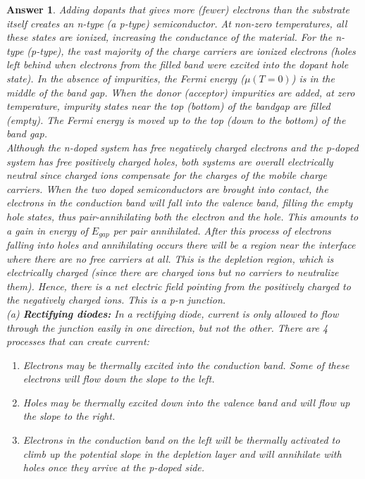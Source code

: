 \documentclass[a4paper]{article}
\newtheorem{ans}{Answer}[subsection]
\theoremstyle{new}
\begin{document}
\begin{ans}
Adding dopants that gives more (fewer) electrons than the substrate itself creates an n-type (a p-type) semiconductor. At non-zero temperatures, all these states are ionized, increasing the conductance of the material. For the n-type (p-type), the vast majority of the charge carriers are ionized electrons (holes left behind when electrons from the filled band were excited into the dopant hole state). In the absence of impurities, the Fermi energy ($\mu(T=0)$) is in the middle of the band gap. When the donor (acceptor) impurities are added, at zero temperature, impurity states near the top (bottom) of the bandgap are filled (empty). The Fermi energy is moved up to the top (down to the bottom) of the band gap.\\[5pt]
Although the n-doped system has free negatively charged electrons and the p-doped system has free positively charged holes, both systems are overall electrically neutral since charged ions compensate for the charges of the mobile charge carriers. When the two doped semiconductors are brought into contact, the electrons in the conduction band will fall into the valence band, filling the empty hole states, thus pair-annihilating both the electron and the hole. This amounts to a gain in energy of $E_{gap}$ per pair annihilated. After this process of electrons falling into holes and annihilating occurs there will be a region near the interface where there are no free carriers at all. This is the depletion region, which is electrically charged (since there are charged ions but no carriers to neutralize them). Hence, there is a net electric field pointing from the positively charged to the negatively charged ions. This is a p-n junction.\\[5pt]
(a) \textbf{Rectifying diodes:} In a rectifying diode, current is only allowed to flow through the junction easily in one direction, but not the other. There are 4 processes that can create current:
\begin{enumerate}
    \item Electrons may be thermally excited into the conduction band. Some of these electrons will flow down the slope to the left.
    \item Holes may be thermally excited down into the valence band and will flow up the slope to the right. 
    \item Electrons in the conduction band on the left will be thermally activated to climb up the potential slope in the depletion layer and will annihilate with holes once they arrive at the p-doped side. 

\end{enumerate}
\end{ans}
\end{document}
